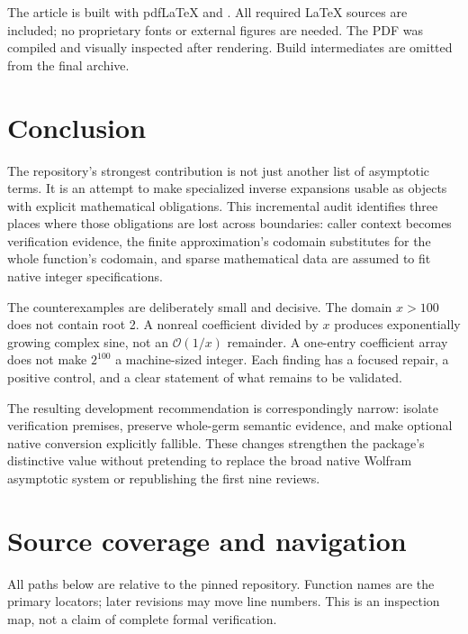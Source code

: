 \documentclass[11pt,a4paper]{article}
\newcommand{\code}[1]{\texttt{\detokenize{#1}}}
\newcommand{\OO}{\mathcal O}
\begin{document}
The article is built with pdfLaTeX and \code{latexmk}. All required LaTeX sources are included; no proprietary fonts or external figures are needed. The PDF was compiled and visually inspected after rendering. Build intermediates are omitted from the final archive.

\section{Conclusion}
The repository's strongest contribution is not just another list of asymptotic terms. It is an attempt to make specialized inverse expansions usable as objects with explicit mathematical obligations. This incremental audit identifies three places where those obligations are lost across boundaries: caller context becomes verification evidence, the finite approximation's codomain substitutes for the whole function's codomain, and sparse mathematical data are assumed to fit native integer specifications.

The counterexamples are deliberately small and decisive. The domain \(x>100\) does not contain root 2. A nonreal coefficient divided by \(x\) produces exponentially growing complex sine, not an \(\OO(1/x)\) remainder. A one-entry coefficient array does not make \(2^{100}\) a machine-sized integer. Each finding has a focused repair, a positive control, and a clear statement of what remains to be validated.

The resulting development recommendation is correspondingly narrow: isolate verification premises, preserve whole-germ semantic evidence, and make optional native conversion explicitly fallible. These changes strengthen the package's distinctive value without pretending to replace the broad native Wolfram asymptotic system or republishing the first nine reviews.

\appendix
\section{Source coverage and navigation}\label{sec:coverage}
All paths below are relative to the pinned repository. Function names are the primary locators; later revisions may move line numbers. This is an inspection map, not a claim of complete formal verification.
\end{document}
